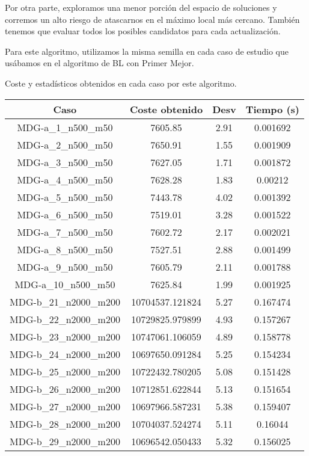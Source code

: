 \documentclass{article}
\begin{document}
Por otra parte, exploramos una menor porción del espacio de soluciones y corremos un alto riesgo de atascarnos en el máximo local
más cercano. También tenemos que evaluar todos los posibles candidatos para cada actualización.

Para este algoritmo, utilizamos la misma semilla en cada caso de estudio que usábamos en el algoritmo de BL con Primer Mejor.

Coste y estadísticos obtenidos en cada caso por este algoritmo.

\begin{table}[H]
	
	\centering
	\begin{tabular}{|cccc|}
		\hline
		Caso & Coste obtenido & Desv & Tiempo (s)\\ \hline
		MDG-a\_1\_n500\_m50 & 7605.85 & 2.91 & 0.001692\\
		MDG-a\_2\_n500\_m50 & 7650.91 & 1.55 & 0.001909\\
		MDG-a\_3\_n500\_m50 & 7627.05 & 1.71 & 0.001872\\
		MDG-a\_4\_n500\_m50 & 7628.28 & 1.83 & 0.00212\\
		MDG-a\_5\_n500\_m50 & 7443.78 & 4.02 & 0.001392\\
		MDG-a\_6\_n500\_m50 & 7519.01 & 3.28 & 0.001522\\
		MDG-a\_7\_n500\_m50 & 7602.72 & 2.17 & 0.002021\\
		MDG-a\_8\_n500\_m50 & 7527.51 & 2.88 & 0.001499\\
		MDG-a\_9\_n500\_m50 & 7605.79 & 2.11 & 0.001788\\
		MDG-a\_10\_n500\_m50 & 7625.84 & 1.99 & 0.001925\\
		MDG-b\_21\_n2000\_m200 & 10704537.121824 & 5.27 & 0.167474\\
		MDG-b\_22\_n2000\_m200 & 10729825.979899 & 4.93 & 0.157267\\
		MDG-b\_23\_n2000\_m200 & 10747061.106059 & 4.89 & 0.158778\\
		MDG-b\_24\_n2000\_m200 & 10697650.091284 & 5.25 & 0.154234\\
		MDG-b\_25\_n2000\_m200 & 10722432.780205 & 5.08 & 0.151428\\
		MDG-b\_26\_n2000\_m200 & 10712851.622844 & 5.13 & 0.151654\\
		MDG-b\_27\_n2000\_m200 & 10697966.587231 & 5.38 & 0.159407\\
		MDG-b\_28\_n2000\_m200 & 10704037.524274 & 5.11 & 0.16044\\
		MDG-b\_29\_n2000\_m200 & 10696542.050433 & 5.32 & 0.156025\\

\end{tabular}
\end{table}
\end{document}
